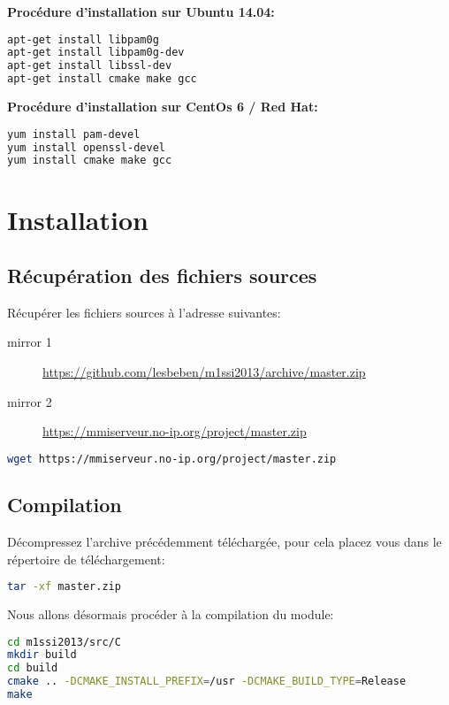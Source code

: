 \documentclass{"../../../res/univ-projet"}
\begin{document}
\textbf{Procédure d'installation sur Ubuntu 14.04:}\\
\begin{lstlisting}[language=bash, backgroundcolor=\color{black}, basicstyle=\color{white}]
apt-get install libpam0g
apt-get install libpam0g-dev
apt-get install libssl-dev
apt-get install cmake make gcc
\end{lstlisting}

\textbf{Procédure d'installation sur CentOs 6 / Red Hat:}\\
\begin{lstlisting}[language=bash, backgroundcolor=\color{black}, basicstyle=\color{white}]
yum install pam-devel
yum install openssl-devel
yum install cmake make gcc
\end{lstlisting}

\newpage

\section{Installation}
\subsection{Récupération des fichiers sources}
Récupérer les fichiers sources à l'adresse suivantes:
\begin{description}
\item[mirror 1] \href{https://github.com/lesbeben/m1ssi2013/archive/master.zip}{https://github.com/lesbeben/m1ssi2013/archive/master.zip}\\

\item[mirror 2] \href{https://mmiserveur.no-ip.org/project/master.zip}{https://mmiserveur.no-ip.org/project/master.zip}\\
\end{description}

\begin{lstlisting}[language=bash, backgroundcolor=\color{black}, basicstyle=\color{white}]
wget https://mmiserveur.no-ip.org/project/master.zip
\end{lstlisting}

\subsection{Compilation}
Décompressez l'archive précédemment téléchargée, pour cela placez vous 
dans le répertoire de téléchargement:
\begin{lstlisting}[language=bash, backgroundcolor=\color{black}, basicstyle=\color{white}]
tar -xf master.zip
\end{lstlisting}
Nous allons désormais procéder à la compilation du module:
\begin{lstlisting}[language=bash, backgroundcolor=\color{black}, basicstyle=\color{white}]
cd m1ssi2013/src/C
mkdir build
cd build
cmake .. -DCMAKE_INSTALL_PREFIX=/usr -DCMAKE_BUILD_TYPE=Release 
make
\end{lstlisting}
\end{document}
